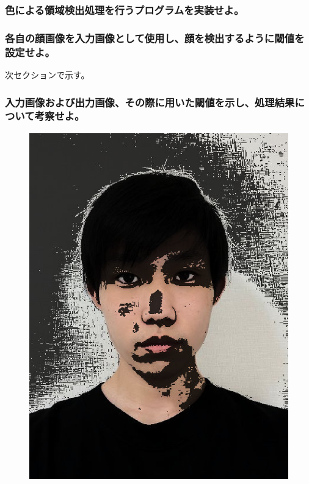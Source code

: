 ﻿\documentclass[a4j,11pt]{jarticle}
\begin{document}
\subsubsection{色による領域検出処理を行うプログラムを実装せよ。}
\subsubsection{各自の顔画像を入力画像として使用し、顔を検出するように閾値を設定せよ。}
次セクションで示す。
\subsubsection{入力画像および出力画像、その際に用いた閾値を示し、処理結果について考察せよ。}
\clearpage
\begin{figure}[tb]

 \begin{minipage}{0.49\hsize} %
   \center
   \includegraphics[width=\hsize]{./eps/color-myface.eps}

\end{minipage}
\end{figure}
\end{document}
